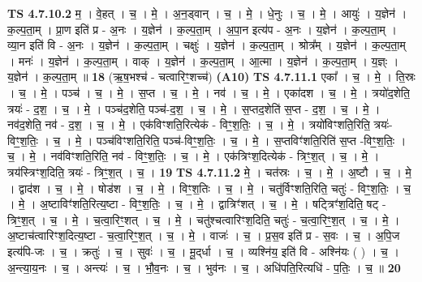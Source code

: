 \documentclass[17pt]{extarticle}
\begin{document}
                  \newline
                                \textbf{ TS 4.7.10.2} \newline
                  म॒ । वे॒हत् । च॒ । मे॒ । अ॒न॒ड्वान् । च॒ । मे॒ । धे॒नुः । च॒ । मे॒ । आयुः॑ । य॒ज्ञेन॑ । क॒ल्प॒ता॒म् । प्रा॒ण इति॑ प्र - अ॒नः । य॒ज्ञेन॑ । क॒ल्प॒ता॒म् । अ॒पा॒न इत्य॑प - अ॒नः । य॒ज्ञेन॑ । क॒ल्प॒ता॒म् । व्या॒न इति॑ वि - अ॒नः । य॒ज्ञेन॑ । क॒ल्प॒ता॒म् । चक्षुः॑ । य॒ज्ञेन॑ । क॒ल्प॒ता॒म् । श्रोत्र᳚म् । य॒ज्ञेन॑ । क॒ल्प॒ता॒म् । मनः॑ । य॒ज्ञेन॑ । क॒ल्प॒ता॒म् । वाक् । य॒ज्ञेन॑ । क॒ल्प॒ता॒म् । आ॒त्मा । य॒ज्ञेन॑ । क॒ल्प॒ता॒म् । य॒ज्ञ्ः । य॒ज्ञेन॑ । क॒ल्प॒ता॒म् ॥ \textbf{  18 } \newline
                  \newline
                      (ऋ॒ष॒भश्च॑ - चत्वारिꣳ॒॒शच्च॑)  \textbf{(A10)} \newline \newline
                                \textbf{ TS 4.7.11.1} \newline
                  एका᳚ । च॒ । मे॒ । ति॒स्रः । च॒ । मे॒ । पञ्च॑ । च॒ । मे॒ । स॒प्त । च॒ । मे॒ । नव॑ । च॒ । मे॒ । एका॑दश । च॒ । मे॒ । त्रयो॑द॒शेति॒ त्रयः॑ - द॒श॒ । च॒ । मे॒ । पञ्च॑द॒शेति॒ पञ्च॑-द॒श॒ । च॒ । मे॒ । स॒प्तद॒शेति॑ स॒प्त - द॒श॒ । च॒ । मे॒ । नव॑द॒शेति॒ नव॑ - द॒श॒ । च॒ । मे॒ । एक॑विꣳशति॒रित्येक॑ - विꣳ॒॒श॒तिः॒ । च॒ । मे॒ । त्रयो॑विꣳशति॒रिति॒ त्रयः॑-विꣳ॒॒श॒तिः॒ । च॒ । मे॒ । पञ्च॑विꣳशति॒रिति॒ पञ्च॑-विꣳ॒॒श॒तिः॒ । च॒ । मे॒ । स॒प्तविꣳ॑शति॒रिति॑ स॒प्त -विꣳ॒॒श॒तिः॒ । च॒ । मे॒ । नव॑विꣳशति॒रिति॒ नव॑ - विꣳ॒॒श॒तिः॒ । च॒ । मे॒ । एक॑त्रिꣳश॒दित्येक॑ - त्रिꣳ॒॒श॒त् । च॒ । मे॒ । त्रय॑स्त्रिꣳश॒दिति॒ त्रयः॑ - त्रिꣳ॒॒श॒त् । च॒ । \textbf{  19} \newline
                  \newline
                                \textbf{ TS 4.7.11.2} \newline
                  मे॒ । चत॑स्रः । च॒ । मे॒ । अ॒ष्टौ । च॒ । मे॒ । द्वाद॑श । च॒ । मे॒ । षोड॑श । च॒ । मे॒ । विꣳ॒श॒तिः । च॒ । मे॒ । चतु॑र्विꣳशति॒रिति॒ चतुः॑ - विꣳ॒॒श॒तिः॒ । च॒ । मे॒ । अ॒ष्टाविꣳ॑शति॒रित्य॒ष्टा - विꣳ॒॒श॒तिः॒ । च॒ । मे॒ । द्वात्रिꣳ॑शत् । च॒ । मे॒ । षट्त्रिꣳ॑श॒दिति॒ षट् - त्रिꣳ॒॒श॒त् । च॒ । मे॒ । च॒त्वा॒रिꣳ॒॒शत् । च॒ । मे॒ । चतु॑श्चत्वारिꣳश॒दिति॒ चतुः॑ - च॒त्वा॒रिꣳ॒॒श॒त् । च॒ । मे॒ । अ॒ष्टाच॑त्वारिꣳश॒दित्य॒ष्टा - च॒त्वा॒रिꣳ॒॒श॒त् । च॒ । मे॒ । वाजः॑ । च॒ । प्र॒स॒व इति॑ प्र - स॒वः । च॒ । अ॒पि॒ज इत्य॑पि-जः । च॒ । क्रतुः॑ । च॒ । सुवः॑ । च॒ । मू॒द्‌र्धा । च॒ । व्यश्नि॑य॒ इति॑ वि - अश्नि॑यः ( ) । च॒ । अ॒न्त्या॒य॒नः । च॒ । अन्त्यः॑ । च॒ । भौ॒व॒नः । च॒ । भुव॑नः । च॒ । अधि॑पति॒रित्यधि॑ - प॒तिः॒ । च॒ ॥ \textbf{  20 } \newline
\end{document}
